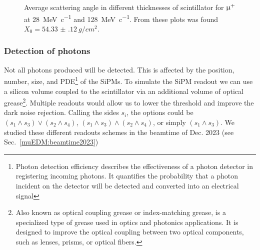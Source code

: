 \begin{refsection}
        \begin{figure}   
            \centering
            \hfill
            \caption{Average scattering angle in different thicknesses of  scintillator for $\upmu^+$ at \SI{28}{MeV\per c} and \SI{128}{MeV\per c}. From these plots was found $X_0 = \SI{54.33(12)}{g/cm^2}$.}
            \label{fig:muEDM:entrance:ms}
        \end{figure}
        
        \subsubsection{Detection of photons}
            Not all photons produced will be detected.
            This is affected by the position, number, size, and PDE\footnote{Photon detection efficiency describes the effectiveness of a photon detector in registering incoming photons. It quantifies the probability that a photon incident on the detector will be detected and converted into an electrical signal} of the SiPMs. 
            To simulate the SiPM readout we can use a silicon volume coupled to the scintillator via an additional volume of optical grease\footnote{Also known as optical coupling grease or index-matching grease, is a specialized type of grease used in optics and photonics applications. It is designed to improve the optical coupling between two optical components, such as lenses, prisms, or optical fibers.}.
            Multiple readouts would allow us to lower the threshold and improve the dark noise rejection. Calling the sides $s_i$, the options could be $(s_1\land s_3)\lor(s_2\land s_4)$, $(s_1\land s_3)\land(s_2\land s_4)$, or simply $(s_1\land s_3)$.
            We studied these different readouts schemes in the beamtime of Dec. 2023 (see Sec.~\ref{muEDM:beamtime2023}) 


\end{refsection}
